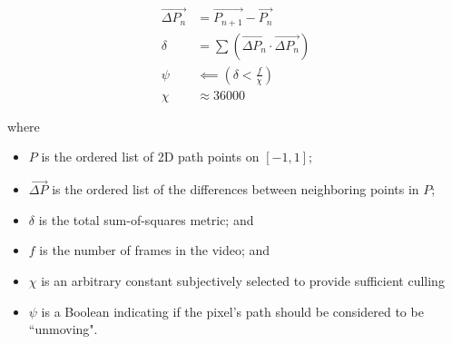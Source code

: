 \begin{align}
    \vec{\Delta P_n}  &= \vec{P_{n+1}} - \vec{P_n} \\
    \delta  &= \sum (\vec{\Delta P_n} \cdotp \vec{\Delta P_n}) \\
    \psi  &\impliedby (\delta < \frac{f}{\chi}) \\
    \chi  &\approx 36000
\end{align}

where
\begin{itemize}
\item $P$ is the ordered list of 2D path points on $[-1,1]$;
\item $\vec{\Delta P}$ is the ordered list of the differences between neighboring points in $P$;
\item $\delta$ is the total sum-of-squares metric; and
\item $f$ is the number of frames in the video; and
\item $\chi$ is an arbitrary constant subjectively selected to provide sufficient culling
\item $\psi$ is a Boolean indicating if the pixel's path should be considered to be ``unmoving".
\end{itemize}
